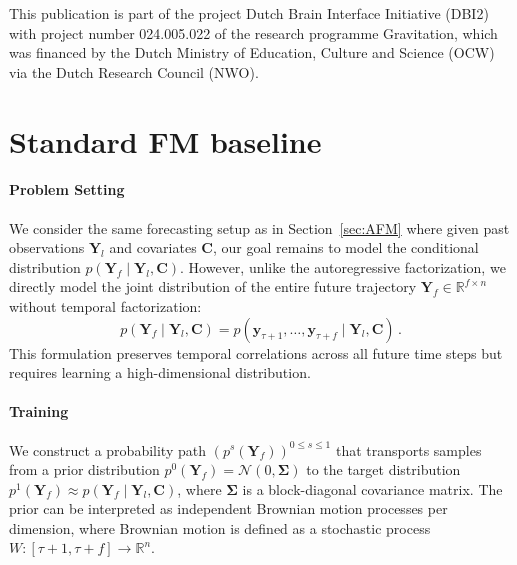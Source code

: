 \documentclass[a4paper,10pt,twocolumn,preprint,3p]{elsarticle}
\begin{document}
This publication is part of the project Dutch Brain Interface Initiative (DBI2) with project number 024.005.022 of the research programme Gravitation, which was financed by the Dutch Ministry of Education, Culture and Science (OCW) via the Dutch Research Council (NWO).




\clearpage
\appendix

\section{Standard FM baseline}\label{app:nafm}

\paragraph{Problem Setting} 
We consider the same forecasting setup as in Section~\ref{sec:AFM} where given past observations $\mathbf{Y}_l$ and covariates $\mathbf{C}$, our goal remains to model the conditional distribution $p(\mathbf{Y}_f \mid \mathbf{Y}_l, \mathbf{C})$. However, unlike the autoregressive factorization, we directly model the joint distribution of the entire future trajectory $\mathbf{Y}_f \in \mathbb{R}^{f \times n}$ without temporal factorization:
\begin{equation}
    p(\mathbf{Y}_f \mid \mathbf{Y}_l, \mathbf{C}) = p(\mathbf{y}_{\tau+1}, \ldots, \mathbf{y}_{\tau+f} \mid \mathbf{Y}_l, \mathbf{C}) \,.
\end{equation}
This formulation preserves temporal correlations across all future time steps but requires learning a high-dimensional distribution.

\paragraph{Training}
We construct a probability path $(p^s(\mathbf{Y}_f))^{0\leq s \leq 1}$ that transports samples from a prior distribution $p^0(\mathbf{Y}_f) = \mathcal{N}(0, \mathbf{\Sigma})$ to the target distribution $p^1(\mathbf{Y}_f) \approx p(\mathbf{Y}_f\mid\mathbf{Y}_l,\mathbf{C})$, where $\mathbf{\Sigma}$ is a block-diagonal covariance matrix. The prior can be interpreted as independent Brownian motion processes per dimension, where Brownian motion is defined as a stochastic process $W \colon [\tau+1,\tau+f] \to \mathbb{R}^n$.
\end{document}
